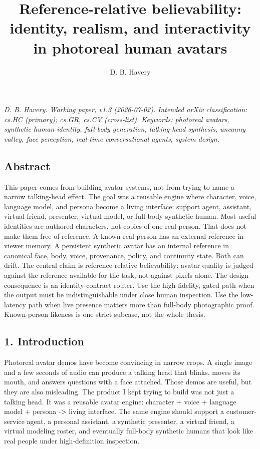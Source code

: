 \documentclass[
]{article}
\title{Reference-relative believability: identity, realism, and
interactivity in photoreal human avatars}
\author{D. B. Havery}
\date{}
\begin{document}
\maketitle

\emph{D. B. Havery. Working paper, v1.3 (2026-07-02).} \emph{Intended
arXiv classification: cs.HC (primary); cs.GR, cs.CV (cross-list).
Keywords: photoreal avatars, synthetic human identity, full-body
generation, talking-head synthesis, uncanny valley, face perception,
real-time conversational agents, system design.}

\subsection{Abstract}\label{abstract}

This paper comes from building avatar systems, not from trying to name a
narrow talking-head effect. The goal was a reusable engine where
character, voice, language model, and persona become a living interface:
support agent, assistant, virtual friend, presenter, virtual model, or
full-body synthetic human. Most useful identities are authored
characters, not copies of one real person. That does not make them free
of reference. A known real person has an external reference in viewer
memory. A persistent synthetic avatar has an internal reference in
canonical face, body, voice, provenance, policy, and continuity state.
Both can drift. The central claim is reference-relative believability:
avatar quality is judged against the reference available for the task,
not against pixels alone. The design consequence is an identity-contract
router. Use the high-fidelity, gated path when the output must be
indistinguishable under close human inspection. Use the low-latency path
when live presence matters more than full-body photographic proof.
Known-person likeness is one strict subcase, not the whole thesis.

\subsection{1. Introduction}\label{1-introduction}

Photoreal avatar demos have become convincing in narrow crops. A single
image and a few seconds of audio can produce a talking head that blinks,
moves its mouth, and answers questions with a face attached. Those demos
are useful, but they are also misleading. The product I kept trying to
build was not just a talking head. It was a reusable avatar engine:
character + voice + language model + persona -\textgreater{} living
interface. The same engine should support a customer-service agent, a
personal assistant, a synthetic presenter, a virtual friend, a virtual
modeling roster, and eventually full-body synthetic humans that look
like real people under high-definition inspection.
\end{document}
